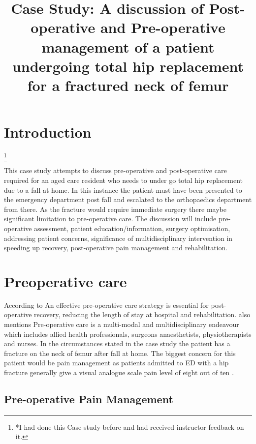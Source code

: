 \documentclass[a4paper,man,british]{apa6}
\title{Case Study: A discussion of Post-operative and Pre-operative management of a patient undergoing total hip replacement for a fractured neck of femur}
\author{}
\affiliation{}
\newcommand\blfootnote[1]{%
  \begingroup
  \renewcommand\thefootnote{}\footnote{#1}%
  \addtocounter{footnote}{-1}%
  \endgroup
}
\begin{document}
\maketitle

\section{}
\section{Introduction} %
%
\blfootnote{*I had done this Case study before and had received instructor feedback on it.}
This case study attempts to discuss pre-operative and post-operative care required for an aged care resident who needs to under go total hip replacement due to a fall at home. In this instance the patient must have been presented to the emergency department post fall and escalated to the orthopaedics department from there. As the fracture would require immediate surgery there maybe significant limitation to pre-operative care. The discussion will include pre-operative assessment, patient education/information, surgery optimisation, addressing patient concerns, significance of multidisciplinary intervention in speeding up recovery, post-operative pain management and rehabilitation.




\section{Preoperative care} %

According to \textcite{molko_rapid_2017} An effective pre-operative care strategy is essential for post-operative recovery, reducing the length of stay at hospital and rehabilitation. \citeauthor{molko_rapid_2017} also mentions Pre-operative care is a multi-modal and multidisciplinary endeavour which includes allied health professionals, surgeons anaesthetists, physiotherapists and nurses. In the circumstances  stated in the case study the patient has a fracture on the neck of femur after fall at home. The biggest concern for this patient would be pain management as patients admitted to ED with a hip fracture generally give a visual analogue scale pain level of eight out of ten \parencite{monzon_pain_2010}.
\newpage
\subsection{Pre-operative Pain Management}
\end{document}
